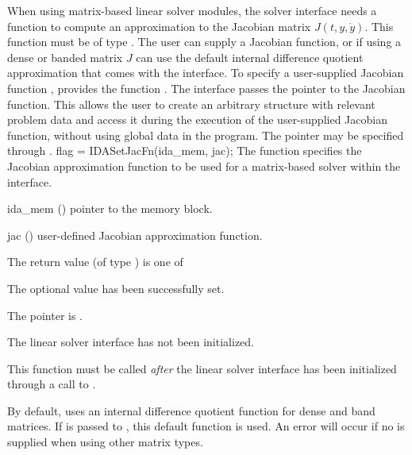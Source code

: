 {
When using matrix-based linear solver modules, the {\idals} solver
interface needs a function to compute an approximation to the Jacobian
matrix $J(t,y,\dot{y})$.  This function must be of type
.  The user can supply a Jacobian function, or if using
a dense or banded matrix $J$ can use the default internal difference
quotient approximation
that comes with the {\idals} interface.
To specify a user-supplied Jacobian function , {\idals} provides
the function .
The {\idals} interface passes the pointer 
to the Jacobian function. This allows the user to
create an arbitrary structure with relevant problem data and access it
during the execution of the user-supplied Jacobian function, without
using global data in the program.
The pointer  may be specified through .
{
  flag = IDASetJacFn(ida\_mem, jac);
}
{
  The function  specifies the Jacobian
  approximation function to be used for a matrix-based solver within
  the {\idals} interface.
}
{
  \begin{args}
  \item[ida\_mem] ()
    pointer to the {\ida} memory block.
  \item[jac] ()
    user-defined Jacobian approximation function.
  \end{args}
}
{
  The return value  (of type ) is one of
  \begin{args}
  \item[\Id{IDALS\_SUCCESS}]
    The optional value has been successfully set.
  \item[\Id{IDALS\_MEM\_NULL}]
    The  pointer is .
  \item[\Id{IDALS\_LMEM\_NULL}]
    The {\idals} linear solver interface has not been initialized.
  \end{args}
}
{
  This function must be called \emph{after} the {\idals} linear solver
  interface has been initialized through a call to
  .

  By default, {\idals} uses an internal difference quotient function
  for dense and band matrices.  If  is passed to ,
  this default function is used.  An error will occur if no 
  is supplied when using other matrix types.

}}

